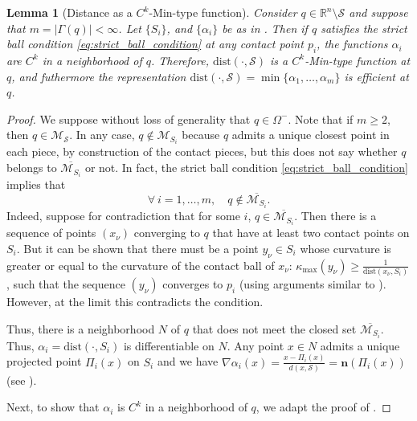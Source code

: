 \documentclass[11pt]{article}
\newcommand{\R}{\mathbb{R}}
\newcommand{\nbf}{\mathbf{n}}
\newcommand{\W}{\Omega}
\newcommand{\kapmax}{\kappa_{\text{max}}}
\newcommand{\dist}{\mathrm{dist}}
\newcommand{\Surf}{\mathcal{S}}
\newcommand{\grad}{\nabla}
\theoremstyle{plain}
\newtheorem{lem}{Lemma}
\theoremstyle{definition}
\theoremstyle{remark}
\begin{document}
	\begin{lem}[Distance as a $C^k$-Min-type function]
		\label{lem:dist_as_min_type}
		Consider $q \in \R^n \setminus \Surf$ and suppose that $m = |\Gamma(q)| < \infty$. Let $\{S_i\}$, and $\{\alpha_i\}$ be as in . 
		Then if $q$ satisfies the strict ball condition \eqref{eq:strict_ball_condition} at any contact point $p_i$, the functions $\alpha_i$ are $C^k$ in a neighborhood of $q$.
		Therefore, $\dist(\cdot, \Surf)$ is a $C^k$-Min-type function at $q$, and futhermore the representation $\dist(\cdot, \Surf) = \min \{\alpha_1,\ldots,\alpha_m\}$ is efficient at $q$.
		
	\end{lem}
	\begin{proof}
		We suppose without loss of generality that $q \in \W^-$. Note that if $m \geq 2$, then $q \in \mathcal{M}_{\Surf}$. In any case, $q \notin \mathcal{M}_{S_i}$ because $q$ admits a unique closest point in each piece, by construction of the contact pieces, but this does not say whether $q$ belongs to $\overline{\mathcal{M}_{S_i}}$ or not. In fact, the strict ball condition \eqref{eq:strict_ball_condition} implies that
		\begin{equation} \label{eq:not_in_pieces_cut_locus}
			\forall\ i = 1,\ldots,m, \quad q \notin \overline{\mathcal{M}_{S_i}}.
		\end{equation}
		Indeed, suppose for contradiction that for some $i$, $q \in \overline{\mathcal{M}_{S_i}}$. Then there is a sequence of points $(x_\nu)$ converging to $q$ that have at least two contact points on $S_i$. But it can be shown that there must be a point $y_\nu \in S_i$ whose curvature is greater or equal to the curvature of the contact ball of $x_\nu$: $\kapmax(y_\nu) \geq \frac{1}{\dist(x_\nu, S_i)} $, such that the sequence $(y_\nu)$ converges to $p_i$ (using arguments similar to \cite{niyogi_finding_2008}). 
		However, at the limit this contradicts the condition.
		
		Thus, there is a neighborhood $N$ of $q$ that does not meet the closed set $\overline{\mathcal{M}_{S_i}}$. Thus, $\alpha_i = \dist(\cdot, S_i)$ is differentiable on $N$. Any point $x \in N$ admits a unique projected point $\Pi_i(x)$ on $S_i$ and we have $\grad \alpha_i(x) = \frac{x - \Pi_i(x)}{d(x,\Surf)} = \nbf(\Pi_i(x))$ (see ). 
		
		Next, to show that $\alpha_i$ is $C^k$ in a neighborhood of $q$, we adapt the proof of \cite[Lemma 14.16]{gilbarg_elliptic_1977}.
		

\end{proof}
\end{document}
